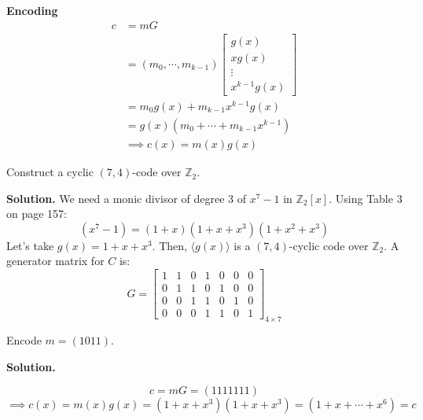 \textbf{Encoding}
\begin{align*}
    c
     & =mG                                \\
     & =(m_0,\cdots,m_{k-1})
    \begin{bmatrix}
        g(x)   \\
        xg(x)  \\
        \vdots \\
        x^{k-1}g(x)
    \end{bmatrix}             \\
     & =m_0g(x)+m_{k-1}x^{k-1}g(x)        \\
     & =g(x)(m_0+\cdots + m_{k-1}x^{k-1}) \\
     & \implies c(x)=m(x)g(x)
\end{align*}

\begin{exbox}
    \begin{example}
        Construct a cyclic $ (7,4) $-code over $ \mathbb{Z}_2 $.

        \textbf{Solution.} We need a monic divisor
        of degree $ 3 $ of $ x^7-1 $ in $ \mathbb{Z}_2[x] $. Using
        Table 3 on page 157:
        \[ (x^7-1)=(1+x)(1+x+x^3)(1+x^2+x^3) \]
        Let's take $ g(x)=1+x+x^3 $. Then, $ \langle g(x)\rangle $ is a
        $ (7,4) $-cyclic code over $ \mathbb{Z}_2 $. A generator matrix
        for $ C $ is:
        \[ G=
            \begin{bmatrix}
                1 & 1 & 0 & 1 & 0 & 0 & 0 \\
                0 & 1 & 1 & 0 & 1 & 0 & 0 \\
                0 & 0 & 1 & 1 & 0 & 1 & 0 \\
                0 & 0 & 0 & 1 & 1 & 0 & 1
            \end{bmatrix}_{4\times 7} \]

        Encode $ m=(1011) $.

        \textbf{Solution.}

        \[ c=mG=(1111111) \]
        \[ \implies c(x)=m(x)g(x)=(1+x+x^3)(1+x+x^3)=(1+x+\cdots+x^6)=c \]
    \end{example}
\end{exbox}
